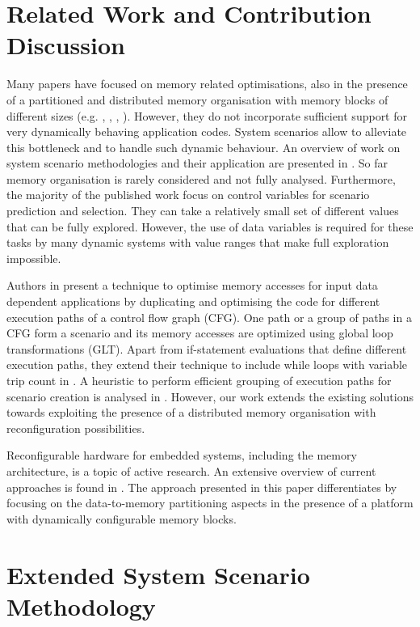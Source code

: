 \section{Related Work and Contribution Discussion}
\label{sec:related}

Many papers have focused on memory related optimisations, also in the presence of a partitioned and distributed memory organisation with memory blocks of different sizes (e.g. \cite{Ben00b}, \cite{Ben00c}, \cite{Mac02}, \cite{Pgk01}). However, they do not incorporate sufficient support for very dynamically behaving application codes. System scenarios allow to alleviate this bottleneck and to handle such dynamic behaviour. An overview of work on system scenario methodologies and their application are presented in \cite{Gheorghita2007}. So far memory organisation is rarely considered and not fully analysed. Furthermore, the majority of the published work focus on control variables for scenario prediction and selection. They can take a relatively small set of different values that can be fully explored. However, the use of data variables \cite{Elena2010} is required for these tasks by many dynamic systems with value ranges that make full exploration impossible. 

Authors in \cite{Pal06} present a technique to optimise memory accesses for input data dependent applications by duplicating and optimising the code for different execution paths of a control flow graph (CFG). One path or a group of paths in a CFG form a scenario and its memory accesses are optimized using global loop transformations (GLT). Apart from if-statement evaluations that define different execution paths, they extend their technique to include while loops with variable trip count in \cite{Pal06b}. A heuristic to perform efficient grouping of execution paths for scenario creation is analysed in \cite{Pal07}. However, our work extends the existing solutions towards exploiting the presence of a distributed memory organisation with reconfiguration possibilities.

Reconfigurable hardware for embedded systems, including the memory architecture, is a topic of active research. An extensive overview of current approaches is found in \cite{Garcia}. The approach presented in this paper differentiates by focusing on the data-to-memory partitioning aspects in the presence of a platform with dynamically configurable memory blocks. 

\section{Extended System Scenario Methodology}
\label{sec:methodology}

